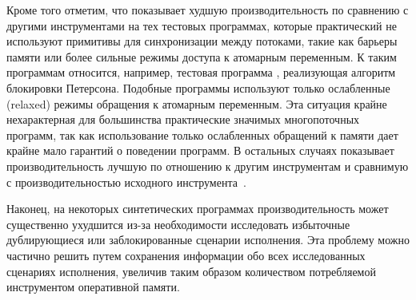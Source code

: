 Кроме того отметим, что \wmc показывает худшую производительность 
по сравнению с другими инструментами на тех тестовых программах, 
которые практический не используют примитивы для синхронизации между потоками, 
такие как барьеры памяти или более сильные режимы доступа к атомарным переменным. 
К таким программам относится, например, тестовая программа , 
реализующая алгоритм блокировки Петерсона. 
Подобные программы используют только ослабленные (relaxed)
режимы обращения к атомарным переменным.
Эта ситуация крайне нехарактерная для большинства 
практические значимых многопоточных программ, 
так как использование только ослабленных обращений к памяти
дает крайне мало гарантий о поведении программ. 
В остальных случаях \wmc показывает производительность 
лучшую по отношению к другим инструментам
и сравнимую с производительностью исходного инструмента~\genmc.

Наконец, на некоторых синтетических программах производительность \wmc 
может существенно ухудшится из-за необходимости исследовать 
избыточные дублирующиеся или заблокированные сценарии исполнения. 
Эта проблему можно частично решить путем сохранения информации
обо всех исследованных сценариях исполнения, увеличив таким образом   
количеством потребляемой инструментом оперативной памяти.
